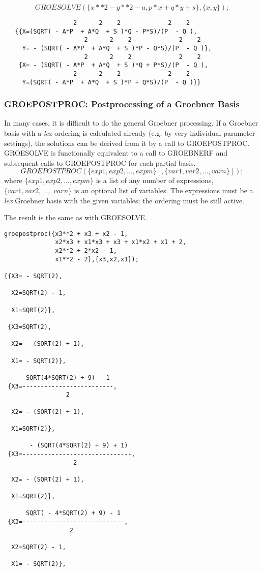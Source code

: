 \[
GROESOLVE(\{x**2 - y**2 - a, p*x+q*y+s\},\{x,y\});
\]
\begin{verbatim}
                   2      2    2             2    2
   {{X=(SQRT( - A*P  + A*Q  + S )*Q - P*S)/(P  - Q ),
                      2      2    2             2    2
     Y= - (SQRT( - A*P  + A*Q  + S )*P - Q*S)/(P  - Q )},
                      2      2    2             2    2
    {X= - (SQRT( - A*P  + A*Q  + S )*Q + P*S)/(P  - Q ),
                   2      2    2             2    2
     Y=(SQRT( - A*P  + A*Q  + S )*P + Q*S)/(P  - Q )}}
\end{verbatim}
\subsubsection{GROEPOSTPROC: Postprocessing of a Groebner Basis}
In many cases, it is difficult to do the general Groebner processing.
If a Groebner basis with a {\it lex} ordering is calculated already (e.g.
by very individual parameter settings), the solutions can be derived
from it by a call to GROEPOSTPROC. GROESOLVE is functionally
equivalent to a call to GROEBNERF and subsequent calls to
GROEPOSTPROC for each partial basis.
\[
 GROEPOSTPROC(\{exp1, exp2, \ldots , expm\}[,\{var1, var2, \ldots ,
varn\}]);
\]
where $\{exp1, exp2, \ldots , expm\}$ is a list of any number of
expressions, \linebreak[4] $\{var1, var2, \ldots ,$ $ varn\}$ is an
optional list of variables. The expressions must be a {\it lex} Groebner
basis with the given variables; the ordering must be still active.

The result is the same as with GROESOLVE.

\begin{verbatim}
groepostproc({x3**2 + x3 + x2 - 1,
              x2*x3 + x1*x3 + x3 + x1*x2 + x1 + 2,
              x2**2 + 2*x2 - 1,
              x1**2 - 2},{x3,x2,x1});

{{X3= - SQRT(2),

  X2=SQRT(2) - 1,

  X1=SQRT(2)},

 {X3=SQRT(2),

  X2= - (SQRT(2) + 1),

  X1= - SQRT(2)},

      SQRT(4*SQRT(2) + 9) - 1
 {X3=-------------------------,
                 2

  X2= - (SQRT(2) + 1),

  X1=SQRT(2)},

       - (SQRT(4*SQRT(2) + 9) + 1)
 {X3=------------------------------,
                   2

  X2= - (SQRT(2) + 1),

  X1=SQRT(2)},

      SQRT( - 4*SQRT(2) + 9) - 1
 {X3=----------------------------,
                  2

  X2=SQRT(2) - 1,

  X1= - SQRT(2)},

\end{verbatim}

